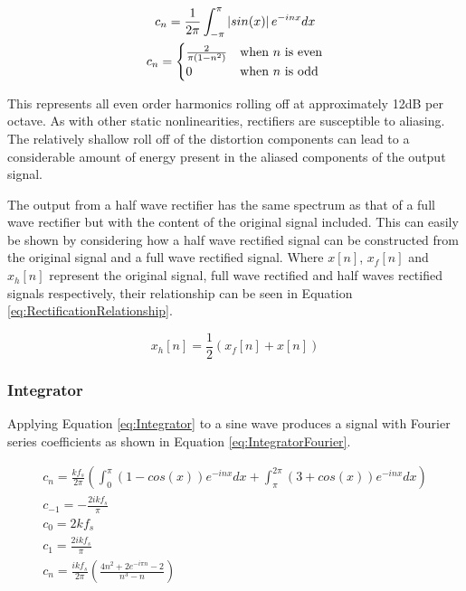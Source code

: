 			\begin{gather}
				c_{n} = \frac{1}{2\pi} \int_{-\pi}^{\pi} \left|sin(x)\right|e^{-inx} dx \nonumber \\
				c_{n} = \begin{cases}
					\frac{2}{\pi(1 - n^{2})} & \text{when $n$ is even} \\
					0 & \text{when $n$ is odd}
				\end{cases}
				\label{eq:RectificationFourier}
			\end{gather}

			This represents all even order harmonics rolling off at approximately 12dB per octave. As with
			other static nonlinearities, rectifiers are susceptible to aliasing. The relatively shallow roll
			off of the distortion components can lead to a considerable amount of energy present in the aliased
			components of the output signal. 

			The output from a half wave rectifier has the same spectrum as that of a full wave rectifier but
			with the content of the original signal included. This can easily be shown by considering how a
			half wave rectified signal can be constructed from the original signal and a full wave rectified
			signal.  Where $x[n]$, $x_{f}[n]$ and $x_{h}[n]$ represent the original signal, full wave rectified
			and half waves rectified signals respectively, their relationship can be seen in Equation
			\ref{eq:RectificationRelationship}.

			\begin{equation}
				x_{h}[n] = \frac{1}{2} \left( x_{f}[n] + x[n] \right)
				\label{eq:RectificationRelationship}
			\end{equation}

		\subsubsection*{Integrator}
			Applying Equation \ref{eq:Integrator} to a sine wave produces a signal with Fourier series
			coefficients as shown in Equation \ref{eq:IntegratorFourier}.

			\begin{gather}
				c_{n} = \frac{kf_{s}}{2\pi} \left( \int_{0}^{\pi} (1 - cos(x))e^{-inx} dx +
							\int_{\pi}^{2\pi} (3 + cos(x))e^{-inx} dx \right) \nonumber \\
				c_{-1} = - \frac{2ikf_{s}}{\pi} \nonumber \\
				c_{0} = 2kf_{s} \nonumber \\
				c_{1} = \frac{2ikf_{s}}{\pi} \nonumber \\
				c_{n} = \frac{ikf_{s}}{2\pi} \left( \frac{4n^{2} + 2e^{-i\pi n} - 2}{n^{3} - n} \right)
				\label{eq:IntegratorFourier}
			\end{gather}

